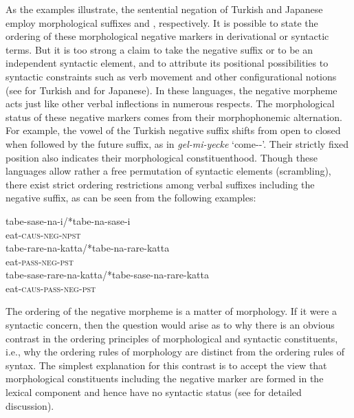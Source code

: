 \documentclass[output=paper]{langsci/langscibook}
\begin{document}
{\noindent
As the examples illustrate, the sentential negation of Turkish and Japanese employ
morphological suffixes   and ,
respectively.
It is possible to state the ordering
of these morphological negative markers in derivational
or syntactic terms. But it is too strong a claim to
take the negative suffix  or   to be an independent syntactic element,
and to attribute its positional possibilities to syntactic constraints
such as verb movement and other configurational notions (see \citet{kelepir} for
Turkish and \citet{Kato:97,Kato:00} for Japanese).
%
In these languages, the negative morpheme acts just like
other verbal inflections in numerous respects.
%
%
%
%
%
The morphological status of
these negative markers comes from their morphophonemic alternation.
For example, the vowel of the Turkish negative suffix  shifts from open to closed when followed by the
future suffix, as in \emph{gel-mi-yecke} `come-\NEG-\FUT'.  Their
strictly fixed position also indicates their morphological
constituenthood. Though these languages allow rather a free permutation of
syntactic elements (scrambling), there exist strict ordering restrictions among
verbal suffixes including the negative suffix, as can be seen from
the following examples:

\eal
\ex
\gll tabe-sase-na-i/*tabe-na-sase-i \\
     eat-\textsc{caus}-\textsc{neg}-\textsc{npst} \\

\ex
\gll tabe-rare-na-katta/*tabe-na-rare-katta \\
     eat-\textsc{pass}-\textsc{neg}-\textsc{pst} \\

\ex
\gll tabe-sase-rare-na-katta/*tabe-sase-na-rare-katta \\
     eat-\textsc{caus}-\textsc{pass}-\textsc{neg}-\textsc{pst} \\
\zl

\noindent
The ordering of the negative morpheme is a matter of morphology.
If it were a syntactic concern, then
the question would arise as to why
there is an obvious contrast in the ordering principles
of morphological and syntactic constituents, i.e., why the ordering
rules of morphology are distinct from the ordering rules of syntax. The
simplest explanation for this contrast is to accept
the view that morphological constituents including the negative marker
are formed in the lexical component and hence have no syntactic
status (see \citet{Kim:00} for detailed discussion).

}
\end{document}

